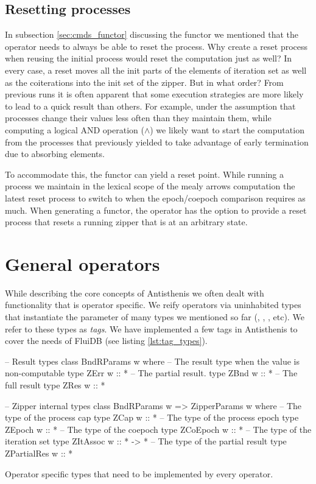 \subsection{Resetting processes}
\label{sec:process_resetting}

In subsection \ref{sec:cmds_functor} discussing the 
functor we mentioned that the operator needs to always be able to
reset the process. Why create a reset process when reusing the initial
process would reset the computation just as well? In every case, a
reset moves all the init parts of the elements of iteration set as
well as the coiterations into the init set of the zipper. But in what
order? From previous runs it is often apparent that some execution
strategies are more likely to lead to a quick result than others. For
example, under the assumption that processes change their values less
often than they maintain them, while computing a logical AND operation
(\(\land\)) we likely want to start the computation from the processes
that previously yielded  to take advantage of early
termination due to absorbing elements.

To accommodate this, the  functor can yield a reset
point. While running a process we maintain in the lexical scope of the
mealy arrows computation the latest reset process to switch to when
the epoch/coepoch comparison requires as much. When generating a
 functor, the operator has the option to provide a reset
process that resets a running zipper that is at an arbitrary state.

\section{General operators}
\label{sec:antisthenis_ops}

While describing the core concepts of Antisthenis we often dealt with
functionality that is operator specific. We reify operators via
uninhabited types that instantiate the  parameter of many
types we mentioned so far (, ,
, etc). We refer to these types as \emph{tags}. We
have implemented a few tags in Antisthenis to cover the needs of
FluiDB (see listing \ref{lst:tag_types}).


\begin{code}
\begin{haskellcode}
-- Result types
class BndRParams w where
  -- The result type when the value is non-computable
  type ZErr w :: *
  -- The partial result.
  type ZBnd w :: *
  -- The full result
  type ZRes w :: *

-- Zipper internal types
class BndRParams w => ZipperParams w where
  -- The type of the process cap
  type ZCap w :: *
  -- The type of the process epoch
  type ZEpoch w :: *
  -- The type of the coepoch
  type ZCoEpoch w :: *
  -- The type of the iteration set
  type ZItAssoc w :: * -> *
  -- The type of the partial result
  type ZPartialRes w :: *
\end{haskellcode}
  \caption{\label{lst:zipper_params}Operator specific types that need
    to be implemented by every operator.}
\end{code}

